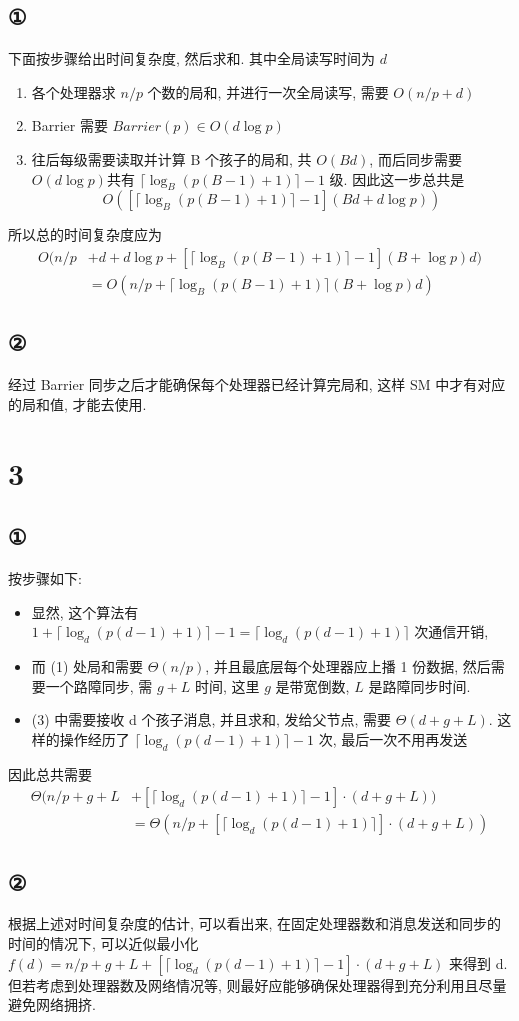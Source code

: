 \documentclass[UTF8]{article}
\newcommand{\ceil}[1]{\lceil#1\rceil}
\begin{document}
\subsection*{①}
\noindent 下面按步骤给出时间复杂度, 然后求和. 其中全局读写时间为 $d$
\begin{enumerate}[(1).]
\item 各个处理器求 $n/p$ 个数的局和, 并进行一次全局读写, 需要 $O(n/p + d)$
\item Barrier 需要 $Barrier(p)\in O(d\log p)$
\item 往后每级需要读取并计算 B 个孩子的局和, 共 $O(Bd)$, 而后同步需要 $O(d\log p)$共有 $\ceil{\log_B(p(B-1)+1)}-1$ 级. 因此这一步总共是 $$O([\ceil{\log_B(p(B-1)+1)}-1](Bd + d\log p))$$
\end{enumerate}
所以总的时间复杂度应为
\begin{align*}
O(n/p&+d+d\log p+[\ceil{\log_B(p(B-1)+1)}-1](B+\log p)d)\\
&=O(n/p+\ceil{\log_B(p(B-1)+1)}(B+\log p)d)
\end{align*}
\subsection*{②}
经过 Barrier 同步之后才能确保每个处理器已经计算完局和, 这样 SM 中才有对应的局和值, 才能去使用.

\newpage
\section*{3}
\subsection*{①}
\noindent 按步骤如下:
\begin{itemize}
\item 显然, 这个算法有 $1 + \ceil{\log_d(p(d-1)+1)}-1=\ceil{\log_d(p(d-1)+1)}$ 次通信开销,
\item 而 (1) 处局和需要 $\Theta(n/p)$, 并且最底层每个处理器应上播 1 份数据, 然后需要一个路障同步, 需 $g+L$ 时间, 这里 $g$ 是带宽倒数, $L$ 是路障同步时间.
\item (3) 中需要接收 d 个孩子消息, 并且求和, 发给父节点, 需要 $\Theta(d+g+L)$. 这样的操作经历了 $\ceil{\log_d(p(d-1)+1)}-1$ 次, 最后一次不用再发送
\end{itemize}
因此总共需要 \begin{align*}
\Theta(n/p+g+L&+[\ceil{\log_d(p(d-1)+1)}-1]\cdot(d+g+L))\\
&=\Theta(n/p+[\ceil{\log_d(p(d-1)+1)}]\cdot(d+g+L))
\end{align*}
\subsection*{②}
根据上述对时间复杂度的估计, 可以看出来, 在固定处理器数和消息发送和同步的时间的情况下, 可以近似最小化 $f(d)=n/p+g+L+[\ceil{\log_d(p(d-1)+1)}-1]\cdot(d+g+L)$ 来得到 d.\\
但若考虑到处理器数及网络情况等, 则最好应能够确保处理器得到充分利用且尽量避免网络拥挤.
\end{document}
